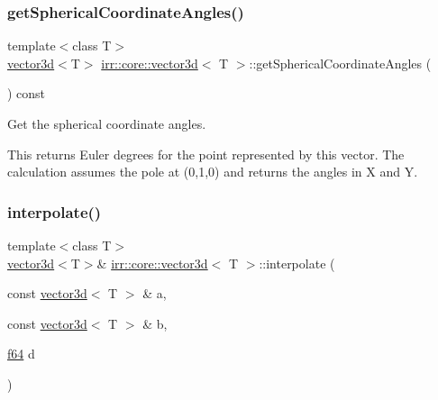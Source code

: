 \subsubsection{\texorpdfstring{get\+Spherical\+Coordinate\+Angles()}{getSphericalCoordinateAngles()}\hspace{0.1cm}{\footnotesize\ttfamily [2/2]}}
{\footnotesize\ttfamily template$<$class T$>$ \\
\hyperlink{classirr_1_1core_1_1vector3d}{vector3d}$<$T$>$ \hyperlink{classirr_1_1core_1_1vector3d}{irr\+::core\+::vector3d}$<$ T $>$\+::get\+Spherical\+Coordinate\+Angles (\begin{DoxyParamCaption}{ }\end{DoxyParamCaption}) const\hspace{0.3cm}{\ttfamily [inline]}}



Get the spherical coordinate angles. 

This returns Euler degrees for the point represented by this vector. The calculation assumes the pole at (0,1,0) and returns the angles in X and Y. \mbox{\label{classirr_1_1core_1_1vector3d_a32a888e0f608a20deee98c794a321c4c}} 
\subsubsection{\texorpdfstring{interpolate()}{interpolate()}\hspace{0.1cm}{\footnotesize\ttfamily [1/2]}}
{\footnotesize\ttfamily template$<$class T$>$ \\
\hyperlink{classirr_1_1core_1_1vector3d}{vector3d}$<$T$>$\& \hyperlink{classirr_1_1core_1_1vector3d}{irr\+::core\+::vector3d}$<$ T $>$\+::interpolate (\begin{DoxyParamCaption}\item[{const \hyperlink{classirr_1_1core_1_1vector3d}{vector3d}$<$ T $>$ \&}]{a,  }\item[{const \hyperlink{classirr_1_1core_1_1vector3d}{vector3d}$<$ T $>$ \&}]{b,  }\item[{\hyperlink{namespaceirr_a1325b02603ad449f92c68fc640af9b28}{f64}}]{d }\end{DoxyParamCaption})\hspace{0.3cm}{\ttfamily [inline]}}



